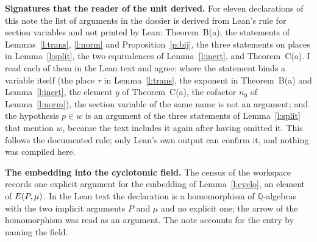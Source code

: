 \documentclass[11pt,a4paper]{article}
\newcommand{\Q}{\mathbb{Q}}
\newcommand{\subhead}[1]{\par\addvspace{9pt plus 2pt}\Needspace{4\baselineskip}\noindent\textbf{#1}\enspace\ignorespaces}
\theoremstyle{plainx}
\theoremstyle{uprightx}
\begin{document}
\subhead{Signatures that the reader of the unit derived.} For eleven declarations of this note the list of arguments
in the dossier is derived from Lean's rule for section variables and not printed by Lean: Theorem~B(a), the
statements of Lemmas~\ref{l:trans}, \ref{l:norm} and Proposition~\ref{p:bij}, the three statements on places in
Lemma~\ref{l:split}, the two equivalences of Lemma~\ref{l:inert}, and Theorem~C(a). I read each of them in the Lean
text and agree: where the statement binds a variable itself (the place $\tau$ in Lemma~\ref{l:trans}, the exponent in
Theorem~B(a) and Lemma~\ref{l:inert}, the element $y$ of Theorem~C(a), the cofactor $n_0$ of Lemma~\ref{l:norm}), the
section variable of the same name is not an argument; and the hypothesis $p\in w$ is an argument of the three
statements of Lemma~\ref{l:split} that mention $w$, because the text includes it again after having omitted it.
This follows the documented rule; only Lean's own output can confirm it, and nothing was compiled here.

\subhead{The embedding into the cyclotomic field.} The census of the workspace records one explicit argument for
the embedding of Lemma~\ref{l:cyclo}, an element of $E(P,\mu)$. In the Lean text the declaration is a
homomorphism of $\Q$-algebras with the two implicit arguments $P$ and $\mu$ and no explicit one; the arrow of the
homomorphism was read as an argument. The note accounts for the entry by naming the field.
\end{document}

